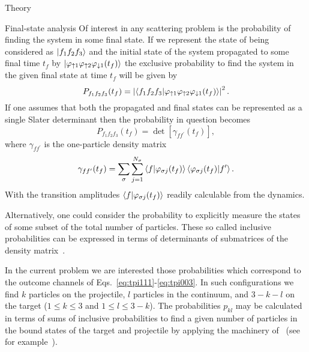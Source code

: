 \documentclass[aps, pra, reprint, groupedaddress, amsfonts,
               amsmath, amssymb, showpacs, nofootinbib]{revtex4-1}
\begin{document}
\begin{section}{Theory \label{sec:theory}}
\begin{subsection}{Final-state analysis \label{sec:probs}}
      Of interest in any scattering problem is the probability of finding the system in some final state.
      If we represent the state of being considered as $\ket{f_1 f_2 f_3}$ and the initial state of the
      system propagated to some final time $t_f$ by $\ket{\varphi_{ \uparrow 1} \varphi_{\uparrow 2}
      \varphi_{\downarrow 1} (t_f)}$ the exclusive probability to find the system in the given final
      state at time $t_f$ will be given by
      \begin{equation} \label{eq:finalProb}
         P_{f_1 f_2 f_3}(t_f) = \left| \braket{ f_1 f_2 f_3 | \varphi_{ \uparrow 1} \varphi_{\uparrow 2}
                                                \varphi_{\downarrow 1} (t_f) } \right|^2.
      \end{equation}
      If one assumes that both the propagated and final states can be represented as a single Slater
      determinant then the probability in question becomes
      \begin{equation} \label{eq:detProb}
         P_{f_1 f_2 f_3}(t_f) = \det \left[ \gamma_{f f^\prime}(t_f) \right],
      \end{equation}
      where $\gamma_{f f^\prime}$ is the one-particle density matrix
      \begin{equation} \label{eq:denmat}
         \gamma_{f f^\prime}(t_f) = \sum\limits_{\sigma} \sum\limits_{j = 1}^{N_\sigma}
                               \braket{f | \varphi_{\sigma j}(t_f)}
                               \braket{\varphi_{\sigma j}(t_f) | f^\prime}.
      \end{equation}
      With the transition amplitudes $\braket{f | \varphi_{\sigma j}(t_f)}$ readily calculable from the
      dynamics.

      Alternatively, one could consider the probability to explicitly measure the states of some subset
      of the total number of particles. These so called inclusive probabilities can be expressed in
      terms of determinants of submatrices of the density matrix~\cite{inc-prob}.
 
      In the current problem we are interested those probabilities which correspond to the outcome
      channels of Eqs.~\eqref{eq:tpi111}-\eqref{eq:tpi003}. In such configurations we find $k$ particles
      on the projectile, $l$ particles in the continuum, and $3 - k - l$ on the target ($1\leq k \leq 3$
      and $1 \leq l \leq 3 - k$). The probabilities $p_{kl}$ may be calculated in terms of sums of
      inclusive probabilities to find a given number of particles in the bound states of the target and
      projectile by applying the machinery of~\cite{inc-prob} (see for example~\cite{incEx, mitsuko12,
      gerald15}).

   \end{subsection}

\end{section}
\end{document}
